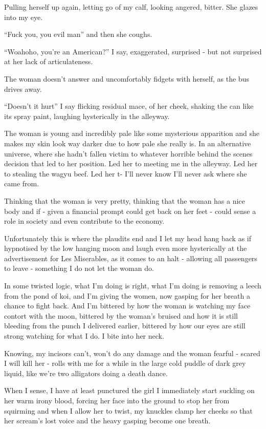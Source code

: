 \documentclass[19pt,openany]{book}
\begin{document}
Pulling herself up
again, letting
go of my calf, looking angered,
bitter. She glazes into my eye.

``Fuck you, you evil man'' and
then she coughs.

``Woahoho, you're an American?'' I
say, exaggerated, surprised - but
not surprised at her
lack of articulateness.

The woman doesn't answer and
uncomfortably fidgets with
herself, as the bus drives
away.

``Doesn't it hurt'' I say
flicking residual mace, of
her cheek, shaking the
can like its spray paint,
laughing hysterically in the alleyway.

The woman is young and
incredibly pale like some mysterious
apparition and she makes my skin
look way darker due to how pale she really
is. In an alternative universe,
where she hadn't fallen
victim to whatever horrible
behind the scenes decision
that led to her position.
Led her to meeting me in the
alleyway. Led her to stealing
the wagyu beef. Led her t-
I'll never know I'll never
ask where she came from.

Thinking that the woman
is very pretty, thinking
that the woman has a nice
body and if - given a financial
prompt could get back
on her feet - could sense
a role in society and even
contribute to the economy.

Unfortunately this is where
the plaudits end and I let
my head hang back as if
hypnotised by the low hanging
moon and laugh even
more hysterically at the
advertisement for Les
Miserables, as it comes
to an halt - allowing all
passengers to leave -
something I do not let the woman
do.

In some twisted logic,
what I'm doing is right,
what I'm doing is removing
a leech from the pond of koi,
and I'm giving the women,
now gasping for her breath
a chance to fight back.
And I'm
bittered by how the woman
is watching my face contort
with the moon, bittered
by the woman's
bruised and how it
is still bleeding
from the punch I delivered
earlier, bittered
by how our eyes
are still strong
watching for what
I do. I bite into her
neck.

Knowing, my incisors
can't, won't do any damage
and the woman fearful - scared
I will kill her - rolls with me
for a while in the large
cold puddle of dark grey
liquid, like we're two alligators
doing a death dance.

When I sense, I have
at least punctured the girl
I immediately start
suckling on her warm irony
blood, forcing
her face into the
ground to stop her
from squirming and
when I allow her to
twist, my knuckles clamp
her cheeks so that her scream's
lost voice and the heavy
gasping become one breath.
\end{document}
